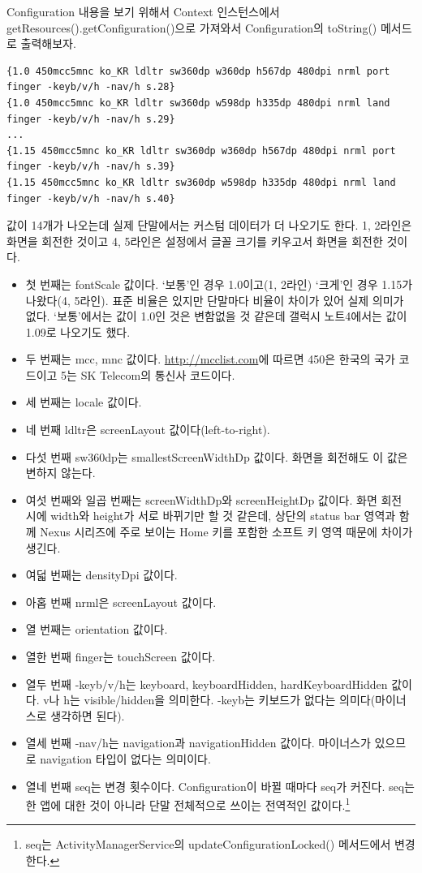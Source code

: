 Configuration 내용을 보기 위해서 Context 인스턴스에서 getResources().getConfigura\-tion()으로 가져와서 Configuration의 toString() 메서드로 출력해보자.
\begin{lstlisting}[frame=single]
{1.0 450mcc5mnc ko_KR ldltr sw360dp w360dp h567dp 480dpi nrml port finger -keyb/v/h -nav/h s.28}
{1.0 450mcc5mnc ko_KR ldltr sw360dp w598dp h335dp 480dpi nrml land finger -keyb/v/h -nav/h s.29}
...
{1.15 450mcc5mnc ko_KR ldltr sw360dp w360dp h567dp 480dpi nrml port finger -keyb/v/h -nav/h s.39}
{1.15 450mcc5mnc ko_KR ldltr sw360dp w598dp h335dp 480dpi nrml land finger -keyb/v/h -nav/h s.40}
\end{lstlisting}
값이 14개가 나오는데 실제 단말에서는 커스텀 데이터가 더 나오기도 한다. 1, 2라인은 화면을 회전한 것이고 4, 5라인은 설정에서 글꼴 크기를 키우고서 화면을 회전한 것이다.
\begin{itemize}
\item 첫 번째는 fontScale 값이다. `보통'인 경우 1.0이고(1, 2라인) `크게'인 경우 1.15가 나왔다(4, 5라인). 표준 비율은 있지만 단말마다 비율이 차이가 있어 실제 의미가 없다. `보통'에서는 값이 1.0인 것은 변함없을 것 같은데 갤럭시 노트4에서는 값이 1.09로 나오기도 했다.
\item 두 번째는 mcc, mnc 값이다. \url{http://mcclist.com}에 따르면 450은 한국의 국가 코드이고 5는 SK Telecom의 통신사 코드이다.
\item 세 번째는 locale 값이다.
\item 네 번째 ldltr은 screenLayout 값이다(left-to-right).
\item 다섯 번째 sw360dp는 smallestScreenWidthDp 값이다. 화면을 회전해도 이 값은 변하지 않는다.
\item 여섯 번째와 일곱 번째는 screenWidthDp와 screenHeightDp 값이다. 화면 회전 시에 width와 height가 서로 바뀌기만 할 것 같은데, 상단의 status bar 영역과 함께 Nexus 시리즈에 주로 보이는 Home 키를 포함한 소프트 키 영역 때문에 차이가 생긴다.
\item 여덟 번째는 densityDpi 값이다.
\item 아홉 번째 nrml은 screenLayout 값이다.
\item 열 번째는 orientation 값이다.
\item 열한 번째 finger는 touchScreen 값이다.
\item 열두 번째 -keyb/v/h는 keyboard, keyboardHidden, hardKeyboardHidden 값이다. v나 h는 visible/hidden을 의미한다. -keyb는 키보드가 없다는 의미다(마이너스로 생각하면 된다).
\item 열세 번째 -nav/h는 navigation과 navigationHidden 값이다. 마이너스가 있으므로 navigation 타입이 없다는 의미이다.
\item 열네 번째 seq는 변경 횟수이다. Configuration이 바뀔 때마다 seq가 커진다. seq는 한 앱에 대한 것이 아니라 단말 전체적으로 쓰이는 전역적인 값이다.\footnote{seq는 ActivityManagerService의 updateConfigurationLocked() 메서드에서 변경한다.}
\end{itemize}

